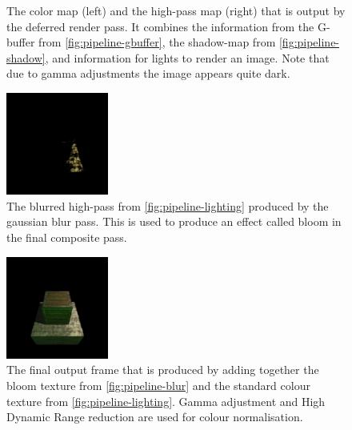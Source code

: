 \documentclass[format=sigconf]{acmart}
\begin{document}
\begin{figure}[H]
\begin{center}
\begin{minipage}{.2\textwidth}
    \end{minipage}
  \end{center}
  \caption{The color map (left) and the high-pass map (right) that is output by the deferred render pass. It combines the information from the G-buffer from \autoref{fig:pipeline-gbuffer}, the shadow-map from \autoref{fig:pipeline-shadow}, and information for lights to render an image. Note that due to gamma adjustments the image appears quite dark.}
  \label{fig:pipeline-lighting}
\end{figure}

\begin{figure}[H]
  \begin{center}
    \includegraphics[width=0.3\textwidth]{pipeline-blur.png}
  \end{center}
  \caption{The blurred high-pass from \autoref{fig:pipeline-lighting} produced by the gaussian blur pass. This is used to produce an effect called bloom in the final composite pass.}
  \label{fig:pipeline-blur}
\end{figure}

\begin{figure}[H]
  \begin{center}
    \includegraphics[width=0.3\textwidth]{pipeline-frame.png}
  \end{center}
  \caption{The final output frame that is produced by adding together the bloom texture from \autoref{fig:pipeline-blur} and the standard colour texture from \autoref{fig:pipeline-lighting}. Gamma adjustment and High Dynamic Range reduction are used for colour normalisation.}
  \label{fig:pipeline-frame}
\end{figure}
\end{document}
